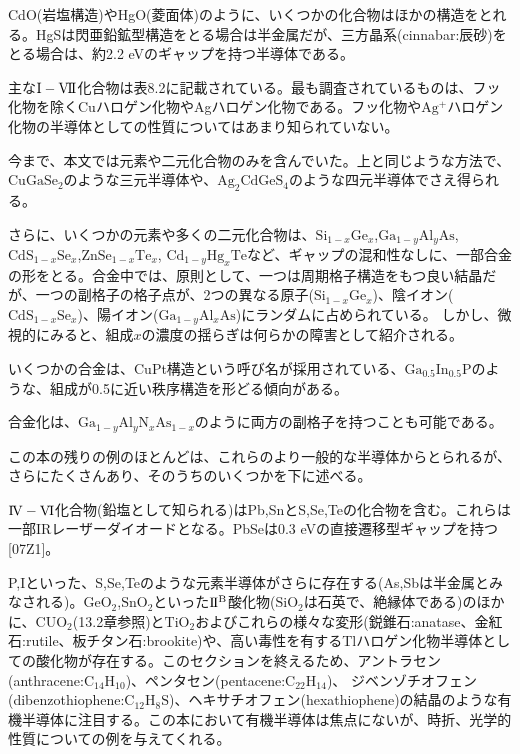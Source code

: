 \documentclass[11pt,a4j,uplatex]{jsarticle}
\begin{document}
CdO(岩塩構造)やHgO(菱面体)のように、いくつかの化合物はほかの構造をとれる。HgSは閃亜鉛鉱型構造をとる場合は半金属だが、三方晶系(cinnabar:辰砂)をとる場合は、約2.2 eVのギャップを持つ半導体である。

主な$\mathrm{I-V\hspace{-1pt}I\hspace{-1pt}I}$化合物は表8.2に記載されている。最も調査されているものは、フッ化物を除くCuハロゲン化物やAgハロゲン化物である。フッ化物や$\mathrm{Ag^+}$ハロゲン化物の半導体としての性質についてはあまり知られていない。

今まで、本文では元素や二元化合物のみを含んでいた。上と同じような方法で、$\mathrm{CuGaSe_2}$のような三元半導体や、$\mathrm{Ag_2CdGeS_4}$のような四元半導体でさえ得られる。

さらに、いくつかの元素や多くの二元化合物は、$\mathrm{Si}_{1-x}\mathrm{Ge}_{x}$,$\mathrm{Ga}_{1-y}\mathrm{Al}_{y}\mathrm{As}$,$\mathrm{Cd}\mathrm{S}_{1-x}\mathrm{Se}_{x}$,$\mathrm{Zn}\mathrm{Se}_{1-x}\mathrm{Te}_{x}$,
$\mathrm{Cd}_{1-y}\mathrm{Hg}_{x}\mathrm{Te}$など、ギャップの混和性なしに、一部合金の形をとる。合金中では、原則として、一つは周期格子構造をもつ良い結晶だが、一つの副格子の格子点が、2つの異なる原子($\mathrm{Si}_{1-x}\mathrm{Ge}_{x}$)、陰イオン($\mathrm{Cd}\mathrm{S}_{1-x}\mathrm{Se}_{x}$)、陽イオン($\mathrm{Ga}_{1-y}\mathrm{Al}_{x}\mathrm{As}$)にランダムに占められている。
しかし、微視的にみると、組成$x$の濃度の揺らぎは何らかの障害として紹介される。

いくつかの合金は、CuPt構造という呼び名が採用されている、$\mathrm{Ga}_{0.5}\mathrm{In}_{0.5}\mathrm{P}$のような、組成が0.5に近い秩序構造を形どる傾向がある。

合金化は、$\mathrm{Ga}_{1-y}\mathrm{Al}_{y}\mathrm{N}_{x}\mathrm{As}_{1-x}$のように両方の副格子を持つことも可能である。

この本の残りの例のほとんどは、これらのより一般的な半導体からとられるが、さらにたくさんあり、そのうちのいくつかを下に述べる。

$\mathrm{I\hspace{-1pt}V-V\hspace{-1pt}I}$化合物(鉛塩として知られる)はPb,SnとS,Se,Teの化合物を含む。これらは一部IRレーザーダイオードとなる。PbSeは0.3 eVの直接遷移型ギャップを持つ[07Z1]。

P,Iといった、S,Se,Teのような元素半導体がさらに存在する(As,Sbは半金属とみなされる)。$\mathrm{GeO_2}$,$\mathrm{SnO_2}$といった$\mathrm{I\hspace{-1pt}I^B}$酸化物($\mathrm{SiO_2}$は石英で、絶縁体である)のほかに、$\mathrm{CUO_2}$(13.2章参照)と$\mathrm{TiO_2}$およびこれらの様々な変形(鋭錐石:anatase、金紅石:rutile、板チタン石:brookite)や、高い毒性を有するTlハロゲン化物半導体としての酸化物が存在する。このセクションを終えるため、アントラセン(anthracene:$\mathrm{C_{14}H_{10}}$)、ペンタセン(pentacene:$\mathrm{C_{22}H_{14}}$)、%
ジベンゾチオフェン(dibenzothiophene:$\mathrm{C_{12}H_{8}S}$)、ヘキサチオフェン(hexathiophene)の結晶のような有機半導体に注目する。この本において有機半導体は焦点にないが、時折、光学的性質についての例を与えてくれる。
\end{document}
